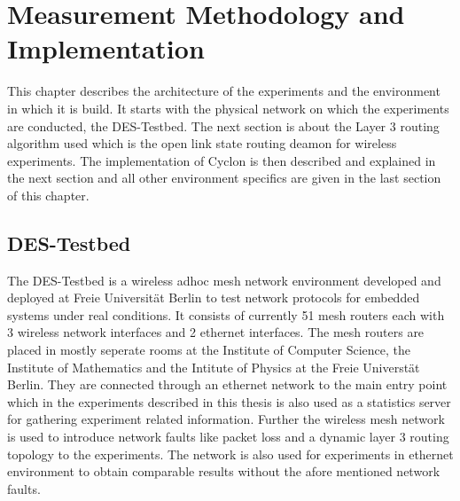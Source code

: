 \chapter{Measurement Methodology and Implementation} 
\label{chap:methodology}
This chapter describes the architecture of the experiments and the environment
in which it is build. It starts with the physical network on which the
experiments are conducted, the DES-Testbed. The next section is about the Layer
3 routing algorithm used which is the open link state routing deamon for
wireless experiments. The implementation of Cyclon is then described and
explained in the next section and all other environment specifics are given in
the last section of this chapter.

\section{DES-Testbed}
The DES-Testbed is a wireless adhoc mesh network environment developed and
deployed at Freie Universität Berlin to test network protocols for embedded
systems under real conditions. It consists of currently 51 mesh routers each
with 3 wireless network interfaces and 2 ethernet interfaces. The mesh routers
are placed in mostly seperate rooms at the Institute of Computer Science, the
Institute of Mathematics and the Intitute of Physics at the Freie Universtät
Berlin. They are connected through an ethernet network to the main entry point
which in the experiments described in this thesis is also used as a statistics
server for gathering experiment related information. Further the wireless mesh
network is used to introduce network faults like packet loss and a
dynamic layer 3 routing topology to the experiments. The network is also used
for experiments in ethernet environment to obtain comparable results without the
afore mentioned network faults. 
%

